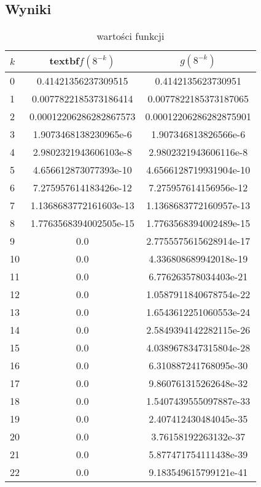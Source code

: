 \documentclass[12pt]{article}
\begin{document}
\subsection{Wyniki}
\begin{table}[h]
    \caption{wartości funkcji}
    \label{wartościfg}
    \centering
    \begin{tabular}{|l|c|c|}
        \hline 
        \textbf{$k$} & textbf{$f({8^{-k}})$} & \textbf{$g({8^{-k}})$} \\
        \hline
        0 & 0.41421356237309515 & 0.4142135623730951\\
        \hline
        1 & 0.0077822185373186414 & 0.0077822185373187065\\
        \hline
        2 & 0.00012206286282867573 & 0.00012206286282875901\\
        \hline
        3 & 1.9073468138230965e-6 & 1.907346813826566e-6\\
        \hline
        4 & 2.9802321943606103e-8 & 2.9802321943606116e-8\\
        \hline
        5 & 4.656612873077393e-10 & 4.6566128719931904e-10\\
        \hline
        6 & 7.275957614183426e-12 & 7.275957614156956e-12\\
        \hline
        7 & 1.1368683772161603e-13 & 1.1368683772160957e-13\\
        \hline
        8 & 1.7763568394002505e-15 & 1.7763568394002489e-15\\
        \hline
        9 & 0.0 & 2.7755575615628914e-17\\
        \hline
        10 & 0.0 & 4.336808689942018e-19\\
        \hline
        11 & 0.0 & 6.776263578034403e-21\\
        \hline
        12 & 0.0 & 1.0587911840678754e-22\\
        \hline
        13 & 0.0 & 1.6543612251060553e-24\\
        \hline
        14 & 0.0 & 2.5849394142282115e-26\\
        \hline
        15 & 0.0 & 4.0389678347315804e-28\\
        \hline
        16 & 0.0 & 6.310887241768095e-30\\
        \hline
        17 & 0.0 & 9.860761315262648e-32\\
        \hline
        18 & 0.0 & 1.5407439555097887e-33\\
        \hline
        19 & 0.0 & 2.407412430484045e-35\\
        \hline
        20 & 0.0 & 3.76158192263132e-37\\
        \hline
        21 & 0.0 & 5.877471754111438e-39\\
        \hline
        22 & 0.0 & 9.183549615799121e-41\\
        \hline
    \end{tabular} 
\end{table}
\end{document}
